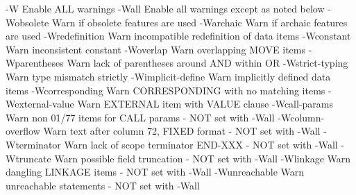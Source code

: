   -W                    Enable ALL warnings
  -Wall                 Enable all warnings except as noted below
  -Wobsolete            Warn if obsolete features are used
  -Warchaic             Warn if archaic features are used
  -Wredefinition        Warn incompatible redefinition of data items
  -Wconstant            Warn inconsistent constant
  -Woverlap             Warn overlapping MOVE items
  -Wparentheses         Warn lack of parentheses around AND within OR
  -Wstrict-typing       Warn type mismatch strictly
  -Wimplicit-define     Warn implicitly defined data items
  -Wcorresponding       Warn CORRESPONDING with no matching items
  -Wexternal-value      Warn EXTERNAL item with VALUE clause
  -Wcall-params         Warn non 01/77 items for CALL params
                        - NOT set with -Wall
  -Wcolumn-overflow     Warn text after column 72, FIXED format
                        - NOT set with -Wall
  -Wterminator          Warn lack of scope terminator END-XXX
                        - NOT set with -Wall
  -Wtruncate            Warn possible field truncation
                        - NOT set with -Wall
  -Wlinkage             Warn dangling LINKAGE items
                        - NOT set with -Wall
  -Wunreachable         Warn unreachable statements
                        - NOT set with -Wall

